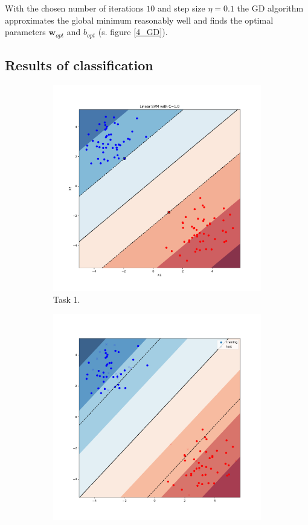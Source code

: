 \documentclass{article}
\begin{document}
With the chosen number of iterations $10$ and step size $\eta=0.1$ the GD algorithm approximates the global minimum reasonably well and finds the optimal parameters $\mathbf{w}_{opt}$ and $b_{opt}$ (s. figure \ref{4_GD}).

\subsection{Results of classification}

\begin{figure}[!ht]
\centering
\begin{subfigure}{0.7\textwidth}
\centering
\includegraphics[width=\textwidth]{./Figures/1a_bound}
\caption{Task 1.}
\end{subfigure}
\begin{subfigure}{0.7\textwidth}
\centering
\includegraphics[width=\textwidth]{./Figures/4_bound}

\end{subfigure}
\end{figure}
\end{document}
